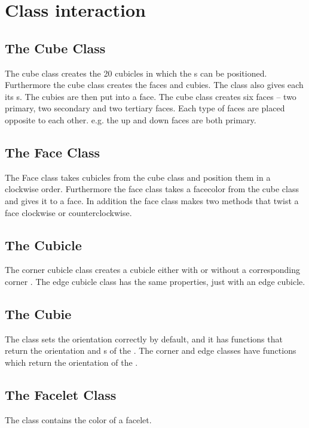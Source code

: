 \section{Class interaction}
\myTop{}
\subsection{The Cube Class}
The cube class creates the 20 cubicles in which the \cpiece{}s can be positioned. Furthermore the cube class creates the faces and cubies. The class also gives each \cpiece{} its \facelet{}s. The cubies are then put into a face. The cube class creates six faces -- two primary, two secondary and two tertiary faces. Each type of faces are placed opposite to each other. e.g. the up and down faces are both primary.
\subsection{The Face Class}
The Face class takes cubicles from the cube class and position them in a clockwise order. Furthermore the face class takes a facecolor from the cube class and gives it to a face. In addition the face class makes two methods that twist a face clockwise or counterclockwise.
\subsection{The Cubicle}
The corner cubicle class creates a cubicle either with or without a corresponding corner \cpiece{}. The edge cubicle class has the same properties, just with an edge cubicle.
\subsection{The Cubie}
The \cpiece{} class sets the orientation correctly by default, and it has functions that return the orientation and \facelet{}s of the \cpiece{}. The corner and edge \cpiece{} classes have functions which return the orientation of the \cpiece{}.
\subsection{The Facelet Class}
The \facelet{} class contains the color of a facelet.
\myTail{}